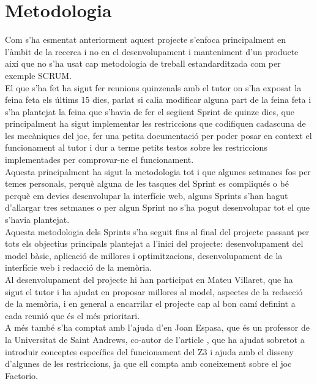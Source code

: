 


\chapter{Metodologia} %

\label{Metodologia} %

Com s'ha esmentat anteriorment aquest projecte s'enfoca principalment en l'àmbit de la recerca i no en el desenvolupament i manteniment d'un producte així que no s'ha usat cap metodologia de treball estandarditzada com per exemple SCRUM.\\

El que s'ha fet ha sigut fer reunions quinzenals amb el tutor on s'ha exposat la feina feta els últims 15 dies, parlat si calia modificar alguna part de la feina feta i s'ha plantejat la feina que s'havia de fer el següent Sprint de quinze dies, que principalment ha sigut implementar les restriccions que codifiquen cadascuna de les mecàniques del joc, fer una petita documentació per poder posar en context el funcionament al tutor i dur a terme petits testos sobre les restriccions implementades per comprovar-ne el funcionament.\\

Aquesta principalment ha sigut la metodologia tot i que algunes setmanes fos per temes personals, perquè alguna de les tasques del Sprint es compliqués o bé perquè em devies desenvolupar la interfície web, alguns Sprints s'han hagut d'allargar tres setmanes o per algun Sprint no s'ha pogut desenvolupar tot el que s'havia plantejat.\\
Aquesta metodologia dels Sprints s'ha seguit fins al final del projecte passant per tots els objectius principals plantejat a l'inici del projecte: desenvolupament del model bàsic, aplicació de millores i optimitzacions, desenvolupament de la interfície web i redacció de la memòria.\\

Al desenvolupament del projecte hi han participat en Mateu Villaret, que ha sigut el tutor i ha ajudat en proposar millores al model, aspectes de la redacció de la memòria, i en general a encarrilar el projecte cap al bon camí definint a cada reunió que és el més prioritari.\\
A més també s'ha comptat amb l'ajuda d'en Joan Espasa, que és un professor de la Universitat de Saint Andrews, co-autor de l'article \cite{arxivpaper}, que ha ajudat sobretot a introduir conceptes específics del funcionament del Z3 i ajuda amb el disseny d'algunes de les restriccions, ja que ell compta amb coneixement sobre el joc Factorio.



